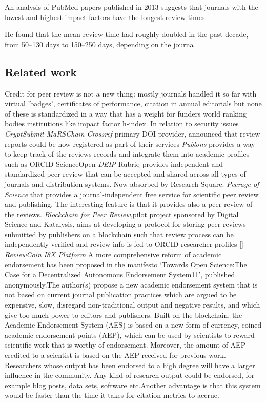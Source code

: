 \documentclass[runningheads]{llncs}
\begin{document}
An analysis of PubMed papers published in 2013 suggests that journals with the lowest and highest impact factors have the longest review times.

He found that the mean review time had roughly doubled in the past decade, from 50–130 days to 150–250 days, depending on the journa


\subsection{Related work}
Credit for peer review is not a new thing: mostly journals handled it so far with virtual 'badges', certificates of performance, citation in annual editorials but none of these is standardized in a way that has a weight for funders world ranking bodies institutions like impact factor h-index.
In relation to security issues \emph{CryptSubmit} \emph{MaRSChain}
\emph{Crossref} primary DOI provider, announced that review reports could be now registered as part of their services
\emph{Publons} provides a way to keep track of the reviews records and integrate them into academic profiles such as ORCID
ScienceOpen
\emph{DEIP}
Rubriq provides independent and standardized peer review that can be accepted and shared across all types of journals and distribution systems. Now absorbed by Research Square.
\emph{Peerage of Science} that provides a journal-independent free service for scientific peer review and publishing. The interesting feature is that it provides also a peer-review of the reviews.
\emph{Blockchain for Peer Review,}pilot project sponsored by Digital Science and Katalysis, aims at developing a protocol for storing peer reviews submitted by publishers on a blockchain such that review process can be independently verified and review info is fed to ORCID researcher profiles []
\emph{ReviewCoin}
\emph{I8X Platform}
A more comprehensive reform of academic endorsement has been proposed in the manifesto ‘Towards Open Science:The Case for a Decentralized Autonomous Endorsement System11’, published anonymously.The author(s) propose a new academic endorsement system that is not based on current journal publication practices which are argued to be expensive, slow, disregard non-traditional output and negative results, and which give too much power to editors and publishers. Built on the blockchain, the Academic Endorsement System (AES) is based on a new form of currency, coined academic endorsement points (AEP), which can be used by scientists to reward scientific work that is worthy of endorsement. Moreover, the amount of AEP credited to a scientist is based on the AEP received for previous work. Researchers whose output has been endorsed to a high degree will have a larger influence in the community. Any kind of research output could be endorsed, for example blog posts, data sets, software etc.Another advantage is that this system would be faster than the time it takes for citation metrics to accrue.
\end{document}
